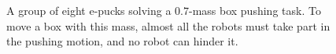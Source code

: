 \documentclass[a4paper,10pt]{article}
\begin{document}
\begin{figure}[!h]
    \caption{A group of eight e-pucks solving a $0.7$-mass box pushing task.
    To move a box with this mass, almost all the robots must take part in the
    pushing motion, and no robot can hinder it.}
    \label{mass robots}
\end{figure}


\label{sec:b2}



 
\end{document}
